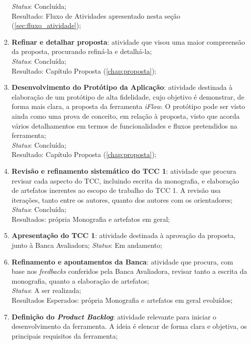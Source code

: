 \begin{enumerate}
    \textit{Status}: Concluída;
    \\
    Resultado: Fluxo de Atividades apresentado nesta seção (\ref{sec:fluxo_atividade});
    \item \textbf{Refinar e detalhar proposta}: atividade que visou uma maior compreensão da proposta, procurando refiná-la e detalhá-la;
    \\
    \textit{Status}: Concluída;
    \\
    Resultado: Capítulo Proposta (\ref{chap:proposta});
    \item \textbf{Desenvolvimento do Protótipo da Aplicação}: atividade destinada à elaboração de um protótipo de alta fidelidade, cujo objetivo é demonstrar, de forma mais clara, a proposta da ferramenta \textit{iFlow}. O protótipo pode ser visto ainda como uma prova de conceito, em relação à proposta, visto que acorda vários detalhamentos em termos de funcionalidades e fluxos pretendidos na ferramenta;
    \\
    \textit{Status}: Concluída;
    \\
    Resultado: Capítulo Proposta (\ref{chap:proposta});
    \item \textbf{Revisão e refinamento sistemático do TCC 1}: atividade que procura revisar cada aspecto do TCC, incluindo escrita da monografia, e elaboração de artefatos inerentes ao escopo de trabalho do TCC 1. A revisão usa iterações, tanto entre os autores, quanto dos autores com os orientadores;
    \\
    \textit{Status}: Concluída;
    \\
    Resultados: própria Monografia e artefatos em geral;
    \item \label{item:revision} \textbf{Apresentação do TCC 1}: atividade destinada à aprovação da proposta, junto à Banca Avaliadora;
    \textit{Status}: Em andamento;
    \item \textbf{Refinamento e apontamentos da Banca}: atividade que procura, com base nos \textit{feedbacks} conferidos pela Banca Avaliadora, revisar tanto a escrita da monografia, quanto a elaboração de artefatos;
    \\
    \textit{Status}: A ser realizada;
    \\
    Resultados Esperados: própria Monografia e artefatos em geral evoluídos;
    \item \textbf{Definição do \textit{Product Backlog}}: atividade relevante para iniciar o desenvolvimento da ferramenta. A ideia é elencar de forma clara e objetiva, os principais requisitos da ferramenta;

\end{enumerate}
